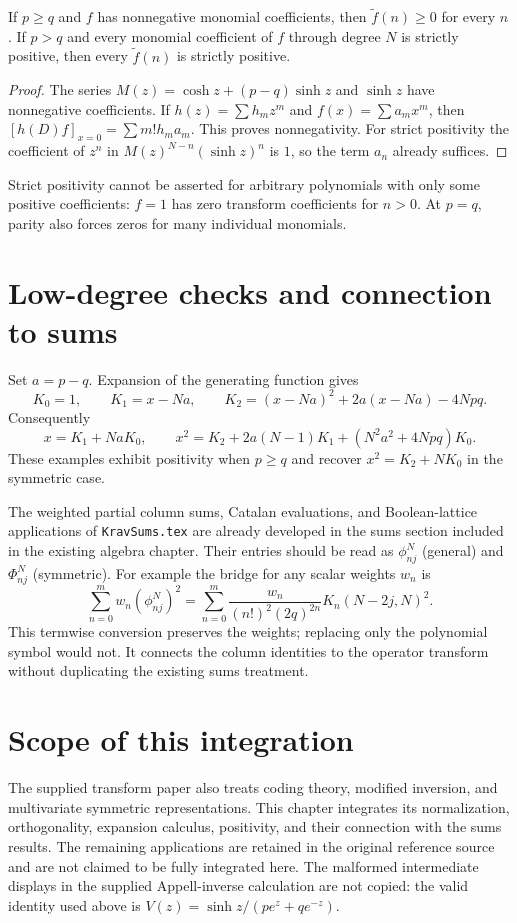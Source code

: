 \begin{proposition}
If $p\ge q$ and $f$ has nonnegative monomial coefficients, then
$\widetilde f(n)\ge0$ for every $n$. If $p>q$ and every monomial
coefficient of $f$ through degree $N$ is strictly positive, then every
$\widetilde f(n)$ is strictly positive.
\end{proposition}
\begin{proof}
The series $M(z)=\cosh z+(p-q)\sinh z$ and $\sinh z$ have nonnegative
coefficients. If $h(z)=\sum h_mz^m$ and $f(x)=\sum a_mx^m$, then
$[h(D)f]_{x=0}=\sum m!h_ma_m$. This proves nonnegativity.
For strict positivity the coefficient of $z^n$ in
$M(z)^{N-n}(\sinh z)^n$ is $1$, so the term $a_n$ already suffices.
\end{proof}
Strict positivity cannot be asserted for arbitrary polynomials with only
some positive coefficients: $f=1$ has zero transform coefficients for $n>0$.
At $p=q$, parity also forces zeros for many individual monomials.

\section{Low-degree checks and connection to sums}
Set $a=p-q$. Expansion of the generating function gives
\begin{equation*}
K_0=1,\qquad K_1=x-Na,\qquad
K_2=(x-Na)^2+2a(x-Na)-4Npq.
\end{equation*}
Consequently
\begin{equation*}
x=K_1+NaK_0,
\qquad
x^2=K_2+2a(N-1)K_1+(N^2a^2+4Npq)K_0.
\end{equation*}
These examples exhibit positivity when $p\ge q$ and recover
$x^2=K_2+NK_0$ in the symmetric case.

The weighted partial column sums, Catalan evaluations, and Boolean-lattice
applications of \texttt{KravSums.tex} are already developed in the sums
section included in the existing algebra chapter. Their entries should
be read as $\phi^N_{nj}$ (general) and $\Phi^N_{nj}$ (symmetric).
For example the bridge for any scalar weights $w_n$ is
\begin{equation*}
\sum_{n=0}^m w_n(\phi^N_{nj})^2
=\sum_{n=0}^m\frac{w_n}{(n!)^2(2q)^{2n}}
K_n(N-2j,N)^2.
\end{equation*}
This termwise conversion preserves the weights; replacing only the
polynomial symbol would not. It connects the column identities to the
operator transform without duplicating the existing sums treatment.

\section{Scope of this integration}
The supplied transform paper also treats coding theory, modified inversion,
and multivariate symmetric representations. This chapter integrates its
normalization, orthogonality, expansion calculus, positivity, and their
connection with the sums results. The remaining applications are retained
in the original reference source and are not claimed to be fully integrated
here. The malformed intermediate displays in the supplied Appell-inverse
calculation are not copied: the valid identity used above is
$V(z)=\sinh z/(pe^z+qe^{-z})$.
